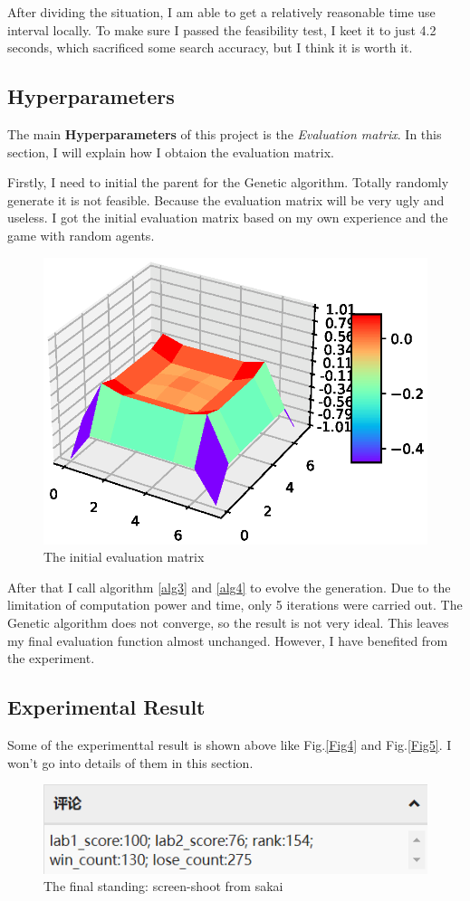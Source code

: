 \documentclass[conference,compsoc]{IEEEtran}
\begin{document}
After dividing the situation, I am able to get a relatively reasonable time use interval locally. To make sure I passed the feasibility test, I keet it to just 4.2 seconds, which sacrificed some search accuracy, but I think it is worth it.

\subsection{Hyperparameters}
The main \textbf{Hyperparameters} of this project is the \emph{Evaluation matrix}. In this section, I will explain how I obtaion the evaluation matrix. 

Firstly, I need to initial the parent for the Genetic algorithm. Totally randomly generate it is not feasible. Because the evaluation matrix will be very ugly and useless. I got the initial evaluation matrix based on my own experience and the game with random agents. 

\begin{figure}[htbp]
\begin{center}
\includegraphics[width=.4\textwidth]{fig/3.eps}
\end{center}
\caption{The initial evaluation matrix}
\label{Fig6}
\end{figure}

After that I call algorithm \ref{alg3} and \ref{alg4} to evolve the generation. Due to the limitation of computation power and time, only 5 iterations were carried out. The Genetic algorithm does not converge, so the result is not very ideal. This leaves my final evaluation function almost unchanged. However, I have benefited from the experiment.

\subsection{Experimental Result}
Some of the experimenttal result is shown above like Fig.\ref{Fig4} and Fig.\ref{Fig5}. I won't go into details of them in this section.

\begin{figure}[htbp]
\begin{center}
\includegraphics[width=.4\textwidth]{fig/result.png}
\end{center}
\caption{The final standing: screen-shoot from sakai}
\label{Fig7}
\end{figure}
\end{document}
